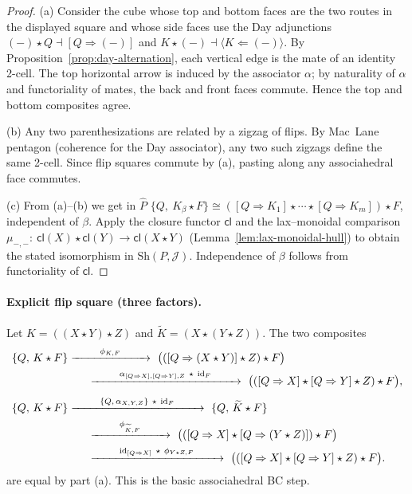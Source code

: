 \documentclass[11pt]{article}
\numberwithin{equation}{section}
\theoremstyle{upright}
\newcommand{\Sh}{\mathrm{Sh}}
\begin{document}
\begin{proof}
(a) Consider the cube whose top and bottom faces are the two routes in the displayed square
and whose side faces use the Day adjunctions
\(
(-)\star Q \dashv [Q\Rightarrow(-)]
\)
and
\(
K\star(-)\dashv \langle K\Leftarrow(-)\rangle
\).
By Proposition~\ref{prop:day-alternation}, each vertical edge is the mate of an identity 2-cell.
The top horizontal arrow is induced by the associator $\alpha$; by naturality of $\alpha$
and functoriality of mates, the back and front faces commute. Hence the top and bottom
composites agree.

(b) Any two parenthesizations are related by a zigzag of flips. By Mac~Lane pentagon
(coherence for the Day associator), any two such zigzags define the same 2-cell.
Since flip squares commute by (a), pasting along any associahedral face commutes.

(c) From (a)–(b) we get in $\widehat P$
\(
\{Q,\ K_\beta\star F\}\cong ([Q\Rightarrow K_1]\star\cdots\star [Q\Rightarrow K_m])\star F
\),
independent of $\beta$. Apply the closure functor $\mathsf{cl}$ and the lax–monoidal
comparison $\mu_{-,-}:\ \mathsf{cl}(X)\star \mathsf{cl}(Y)\to \mathsf{cl}(X\star Y)$
(Lemma~\ref{lem:lax-monoidal-hull}) to obtain the stated isomorphism in $\Sh(P,\mathcal J)$.
Independence of $\beta$ follows from functoriality of $\mathsf{cl}$.
\end{proof}

\paragraph{Explicit flip square (three factors).}
Let $K=((X\star Y)\star Z)$ and $\widetilde K=(X\star(Y\star Z))$. The two composites
\begin{equation}\label{eq:flip-composites}
\begin{aligned}
&\{Q,\,K\star F\}
 \xrightarrow{\ \qquad \phi_{K,F}\ \qquad }\ 
 \bigl(([Q\Rightarrow (X\star Y)]\star Z)\star F\bigr)
\\
&\hspace{6.8em}
 \xrightarrow{\ \qquad \alpha_{[Q\Rightarrow X],[Q\Rightarrow Y],Z}\ \star\ \mathrm{id}_F\ \qquad }\ 
 \bigl(([Q\Rightarrow X]\star [Q\Rightarrow Y]\star Z)\star F\bigr),
\\[.8ex]
&\{Q,\,K\star F\}
 \xrightarrow{\ \qquad \{Q,\,\alpha_{X,Y,Z}\}\ \star\ \mathrm{id}_F\ \qquad }\ 
 \{Q,\,\widetilde K\star F\}
\\
&\hspace{6.8em}
 \xrightarrow{\ \qquad \phi_{\widetilde K,F}\ \qquad }\ 
 \bigl(([Q\Rightarrow X]\star [Q\Rightarrow (Y\star Z)])\star F\bigr)
\\
&\hspace{6.8em}
 \xrightarrow{\ \qquad \mathrm{id}_{[Q\Rightarrow X]}\ \star\ \phi_{Y\star Z,F}\ \qquad }\ 
 \bigl(([Q\Rightarrow X]\star [Q\Rightarrow Y]\star Z)\star F\bigr).
\end{aligned}
\end{equation}
are equal by part (a). This is the basic associahedral BC step.
\end{document}
